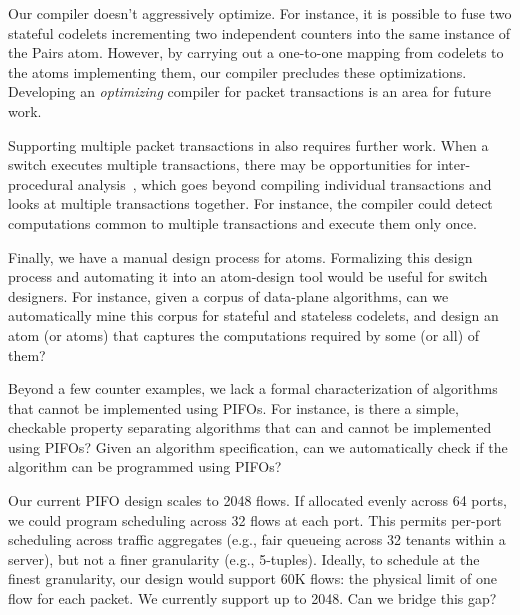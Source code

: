 \begin{CompactEnumerate}
\item Our compiler doesn't aggressively optimize. For instance, it is possible
to fuse two stateful codelets incrementing two independent counters into the
same instance of the Pairs atom. However, by carrying out a one-to-one mapping
from codelets to the atoms implementing them, our compiler precludes these
optimizations.  Developing an {\em optimizing} compiler for packet transactions
is an area for future work.

\item Supporting multiple packet transactions in \pktlanguage also requires
further work. When a switch executes multiple transactions, there may be
opportunities for inter-procedural analysis~\cite{dragonbook}, which goes
beyond compiling individual transactions and looks at multiple transactions
together.  For instance, the compiler could detect computations common to
multiple transactions and execute them only once.

\item Finally, we have a manual design process for atoms.  Formalizing this
design process and automating it into an atom-design tool would be useful for
switch designers. For instance, given a corpus of data-plane algorithms, can we
automatically mine this corpus for stateful and stateless codelets, and design
an atom (or atoms) that captures the computations required by some (or all) of
them?

\item Beyond a few counter examples, we lack a formal characterization of
algorithms that cannot be implemented using PIFOs. For instance, is there a
simple, checkable property separating algorithms that can and cannot be
implemented using PIFOs? Given an algorithm specification, can we
automatically check if the algorithm can be programmed
using PIFOs?

\item Our current PIFO design scales to 2048 flows. If allocated evenly across
64 ports, we could program scheduling across 32 flows at each port. This
permits per-port scheduling across traffic aggregates (e.g., fair queueing
across 32 tenants within a server), but not a finer granularity (e.g.,
5-tuples). Ideally, to schedule at the finest granularity, our design would
support 60K flows: the physical limit of one flow for each packet. We currently
support up to 2048. Can we bridge this gap?
\end{CompactEnumerate}
